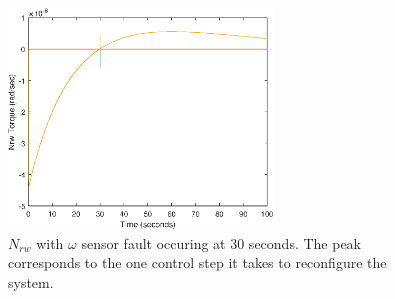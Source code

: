 %

\begin{figure}[H]
	\centering
	\includegraphics[width=70mm]{figures/omegaSensorfault_Nrw}
	\caption{$N_{rw}$ with $\omega$ sensor fault occuring at 30 seconds. The peak corresponds to the one control step it takes to reconfigure the system.}
		\label{fig:angvelcomp2}
\end{figure} 
